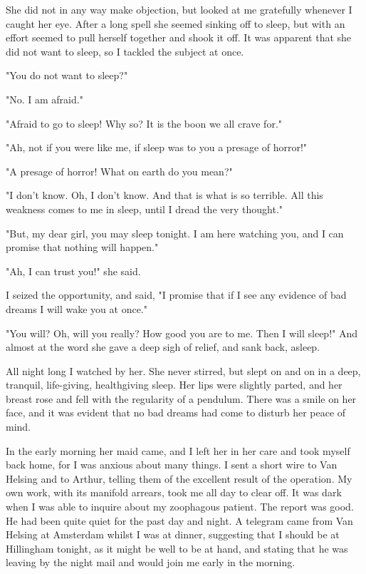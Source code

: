 She did not in any way make objection, but looked at me gratefully whenever I caught her eye. After a long spell she seemed sinking off to sleep, but with an effort seemed to pull herself together and shook it off. It was apparent that she did not want to sleep, so I tackled the subject at once. 

"You do not want to sleep?" 

"No. I am afraid." 

"Afraid to go to sleep! Why so? It is the boon we all crave for." 

"Ah, not if you were like me, if sleep was to you a presage of horror!" 

"A presage of horror! What on earth do you mean?" 

"I don't know. Oh, I don't know. And that is what is so terrible. All this weakness comes to me in sleep, until I dread the very thought." 

"But, my dear girl, you may sleep tonight. I am here watching you, and I can promise that nothing will happen." 

"Ah, I can trust you!" she said. 

I seized the opportunity, and said, "I promise that if I see any evidence of bad dreams I will wake you at once." 

"You will? Oh, will you really? How good you are to me. Then I will sleep!" And almost at the word she gave a deep sigh of relief, and sank back, asleep. 

All night long I watched by her. She never stirred, but slept on and on in a deep, tranquil, life-giving, healthgiving sleep. Her lips were slightly parted, and her breast rose and fell with the regularity of a pendulum. There was a smile on her face, and it was evident that no bad dreams had come to disturb her peace of mind. 

In the early morning her maid came, and I left her in her care and took myself back home, for I was anxious about many things. I sent a short wire to Van Helsing and to Arthur, telling them of the excellent result of the operation. My own work, with its manifold arrears, took me all day to clear off. It was dark when I was able to inquire about my zoophagous patient. The report was good. He had been quite quiet for the past day and night. A telegram came from Van Helsing at Amsterdam whilst I was at dinner, suggesting that I should be at Hillingham tonight, as it might be well to be at hand, and stating that he was leaving by the night mail and would join me early in the morning. 


